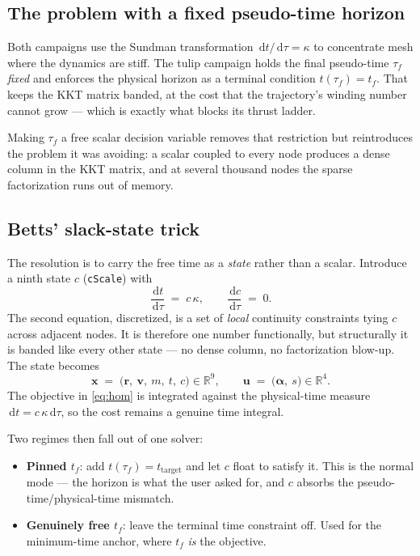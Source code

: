 \documentclass[11pt]{article}
\newcommand{\ud}{\,\mathrm{d}}
\newcommand{\vect}[1]{\bm{#1}}
\begin{document}
\subsection{The problem with a fixed pseudo-time horizon}

Both campaigns use the Sundman transformation $\ud t/\ud\tau=\kappa$ to
concentrate mesh where the dynamics are stiff. The tulip campaign holds the
final pseudo-time $\tau_f$ \emph{fixed} and enforces the physical horizon as a
terminal condition $t(\tau_f)=t_f$. That keeps the KKT matrix banded, at the
cost that the trajectory's winding number cannot grow --- which is exactly what
blocks its thrust ladder.

Making $\tau_f$ a free scalar decision variable removes that restriction but
reintroduces the problem it was avoiding: a scalar coupled to every node
produces a dense column in the KKT matrix, and at several thousand nodes the
sparse factorization runs out of memory.

\subsection{Betts' slack-state trick}

The resolution is to carry the free time as a \emph{state} rather than a
scalar. Introduce a ninth state $c$ (\texttt{cScale}) with
\begin{equation}
\frac{\ud t}{\ud\tau} \;=\; c\,\kappa ,
\qquad
\frac{\ud c}{\ud\tau} \;=\; 0 .
\end{equation}
The second equation, discretized, is a set of \emph{local} continuity
constraints tying $c$ across adjacent nodes. It is therefore one number
functionally, but structurally it is banded like every other state --- no dense
column, no factorization blow-up. The state becomes
\[
\vect{x} \;=\; \big(\vect{r},\ \vect{v},\ m,\ t,\ c\big)\in\mathbb{R}^9 ,
\qquad
\vect{u} \;=\; \big(\vect{\alpha},\ s\big)\in\mathbb{R}^4 .
\]
The objective in \eqref{eq:hom} is integrated against the physical-time measure
$\ud t=c\,\kappa\ud\tau$, so the cost remains a genuine time integral.

Two regimes then fall out of one solver:
\begin{itemize}
\item \textbf{Pinned $t_f$}: add $t(\tau_f)=t_{\text{target}}$ and let $c$
float to satisfy it. This is the normal mode --- the horizon is what the user
asked for, and $c$ absorbs the pseudo-time/physical-time mismatch.
\item \textbf{Genuinely free $t_f$}: leave the terminal time constraint off.
Used for the minimum-time anchor, where $t_f$ \emph{is} the objective.
\end{itemize}
\end{document}

